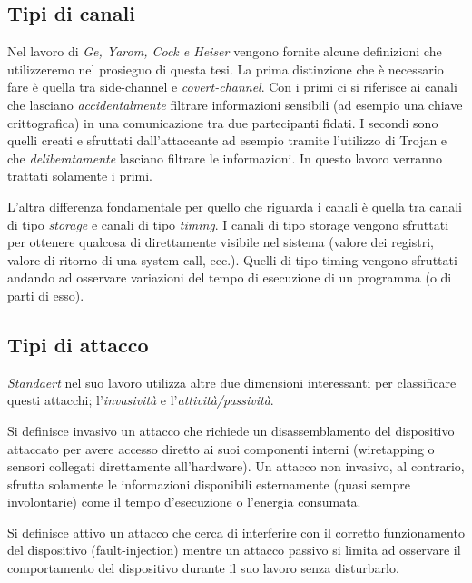 		\subsection*{Tipi di canali}	
			Nel lavoro di \emph{Ge, Yarom, Cock e Heiser}\cite{ge2016survey} vengono fornite alcune definizioni che utilizzeremo nel prosieguo di questa tesi. La prima distinzione che è necessario fare è quella tra side-channel e \emph{covert-channel}. Con i primi ci si riferisce ai canali che lasciano \emph{accidentalmente} filtrare informazioni sensibili (ad esempio una chiave crittografica) in una comunicazione tra due partecipanti fidati. I secondi sono quelli creati e sfruttati dall'attaccante ad esempio tramite l'utilizzo di Trojan e che \emph{deliberatamente} lasciano filtrare le informazioni. In questo lavoro verranno trattati solamente i primi.
			
			L'altra differenza fondamentale per quello che riguarda i canali è quella tra canali di tipo \emph{storage} e canali di tipo \emph{timing}. I canali di tipo storage vengono sfruttati per ottenere qualcosa di direttamente visibile nel sistema (valore dei registri, valore di ritorno di una system call, ecc.). Quelli di tipo timing vengono sfruttati andando ad osservare variazioni del tempo di esecuzione di un programma (o di parti di esso).
			
		\subsection*{Tipi di attacco}		
			\emph{Standaert} nel suo lavoro \cite{standaert2010introduction} utilizza altre due dimensioni interessanti per classificare questi attacchi; l'\emph{invasività} e l'\emph{attività/passività}. 
			
			Si definisce invasivo un attacco che richiede un disassemblamento del dispositivo attaccato per avere accesso diretto ai suoi componenti interni (wiretapping o sensori collegati direttamente all'hardware). Un attacco non invasivo, al contrario, sfrutta solamente le informazioni disponibili esternamente (quasi sempre involontarie) come il tempo d'esecuzione o l'energia consumata.
			
			Si definisce attivo un attacco che cerca di interferire con il corretto funzionamento del dispositivo (fault-injection)\cite{giraud2004dfa,karri2001fault} mentre un attacco passivo si limita ad osservare il comportamento del dispositivo durante il suo lavoro senza disturbarlo. 
			

